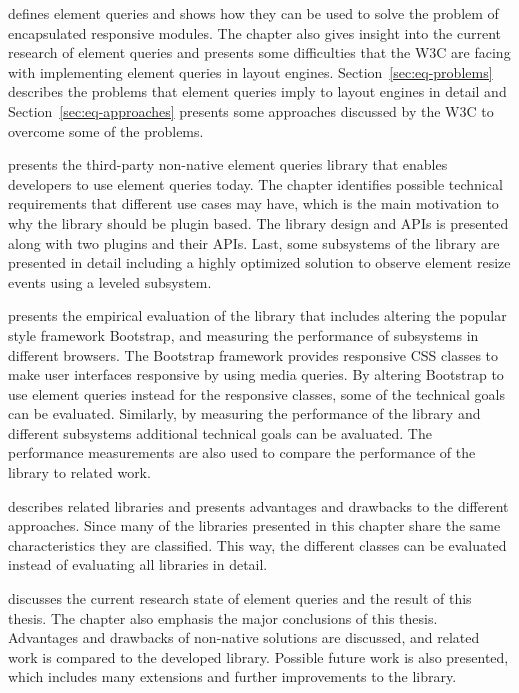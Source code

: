 \documentclass[a4paper,11pt]{kth-mag}
\begin{document}
       defines element queries and shows how they can be used to solve the problem of \gls{encapsulated} \gls{responsive} modules.
      The chapter also gives insight into the current research of element queries and presents some difficulties that the W3C are facing with implementing element queries in \glspl{layout engine}.
      Section~\ref{sec:eq-problems} describes the problems that element queries imply to \glspl{layout engine} in detail and Section~\ref{sec:eq-approaches} presents some approaches discussed by the W3C to overcome some of the problems.

       presents the \gls{third-party} non-\gls{native} element queries library that enables developers to use element queries today.
      The chapter identifies possible technical requirements that different use cases may have, which is the main motivation to why the library should be plugin based.
      The library design and \glspl{API} is presented along with two plugins and their \glspl{API}.
      Last, some subsystems of the library are presented in detail including a highly optimized solution to observe element resize events using a leveled  subsystem.

       presents the empirical evaluation of the library that includes altering the popular style framework \gls{Bootstrap}, and measuring the performance of subsystems in different \glspl{browser}.
      The \gls{Bootstrap} framework provides \gls{responsive} \gls{CSS} classes to make user interfaces \gls{responsive} by using \gls{media queries}.
      By altering \gls{Bootstrap} to use element queries instead for the \gls{responsive} classes, some of the technical goals can be evaluated.
      Similarly, by measuring the performance of the library and different subsystems additional technical goals can be avaluated.
      The performance measurements are also used to compare the performance of the library to related work.

       describes related libraries and presents advantages and drawbacks to the different approaches.
      Since many of the libraries presented in this chapter share the same characteristics they are classified.
      This way, the different classes can be evaluated instead of evaluating all libraries in detail.

       discusses the current research state of element queries and the result of this thesis.
      The chapter also emphasis the major conclusions of this thesis.
      Advantages and drawbacks of non-\gls{native} solutions are discussed, and related work is compared to the developed library.
      Possible future work is also presented, which includes many extensions and further improvements to the library.
\end{document}

